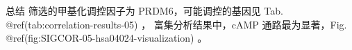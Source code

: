 \documentclass[
  ignorenonframetext,
]{beamer}
\begin{document}
\begin{frame}{总结}
\protect\hypertarget{conclusion}{}
筛选的甲基化调控因子为 PRDM6，可能调控的基因见 Tab.
@ref(tab:correlation-results-05) ， 富集分析结果中，cAMP
通路最为显著，Fig. @ref(fig:SIGCOR-05-hsa04024-visualization) 。
\end{frame}
\end{document}
